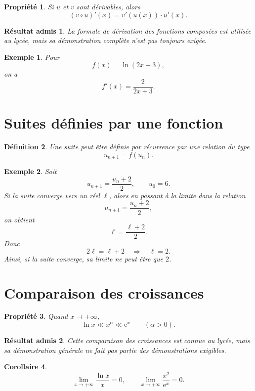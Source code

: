 \documentclass[11pt,a4paper]{article}
\newtheorem{definition}{Définition}[section]
\newtheorem{propriete}[definition]{Propriété}
\newtheorem{corollaire}[definition]{Corollaire}
\newtheorem*{exemple}{Exemple}
\newtheorem*{admis}{Résultat admis}
\newcommand{\e}{\mathrm{e}}
\begin{document}
\begin{propriete}
Si \(u\) et \(v\) sont dérivables, alors
\[
(v\circ u)'(x)=v'(u(x))\cdot u'(x).
\]
\end{propriete}

\begin{admis}
La formule de dérivation des fonctions composées est utilisée au lycée, mais sa démonstration complète n'est pas toujours exigée.
\end{admis}

\begin{exemple}
Pour
\[
f(x)=\ln(2x+3),
\]
on a
\[
f'(x)=\frac{2}{2x+3}.
\]
\end{exemple}

\section{Suites définies par une fonction}

\begin{definition}
Une suite peut être définie par récurrence par une relation du type
\[
u_{n+1}=f(u_n).
\]
\end{definition}

\begin{exemple}
Soit
\[
u_{n+1}=\frac{u_n+2}{2},\qquad u_0=6.
\]
Si la suite converge vers un réel \(\ell\), alors en passant à la limite dans la relation
\[
u_{n+1}=\frac{u_n+2}{2},
\]
on obtient
\[
\ell=\frac{\ell+2}{2}.
\]
Donc
\[
2\ell=\ell+2 \quad \Rightarrow \quad \ell=2.
\]
Ainsi, si la suite converge, sa limite ne peut être que \(2\).
\end{exemple}

\section{Comparaison des croissances}

\begin{propriete}
Quand \(x\to +\infty\),
\[
\ln x \ll x^\alpha \ll \e^x \qquad (\alpha>0).
\]
\end{propriete}

\begin{admis}
Cette comparaison des croissances est connue au lycée, mais sa démonstration générale ne fait pas partie des démonstrations exigibles.
\end{admis}

\begin{corollaire}
\[
\lim_{x\to +\infty}\frac{\ln x}{x}=0,
\qquad
\lim_{x\to +\infty}\frac{x^2}{\e^x}=0.
\]
\end{corollaire}
\end{document}
